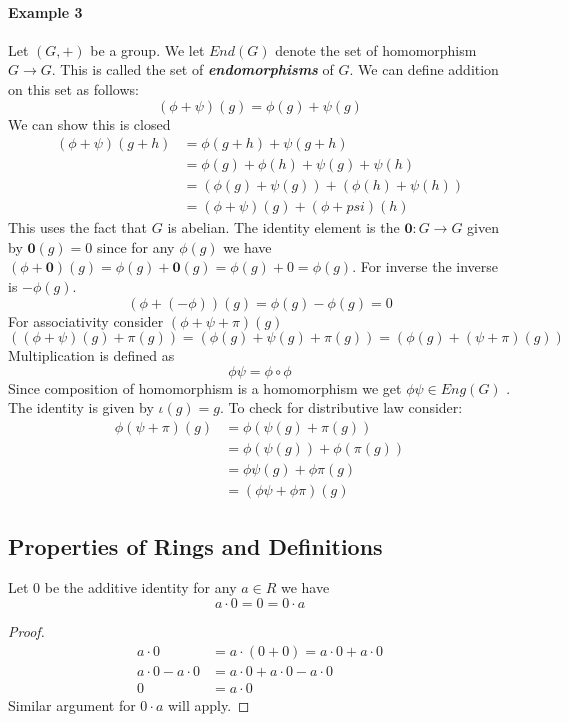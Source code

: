 \documentclass[16pt,a4paper]{article}
\theoremstyle{definition}
\begin{document}
\newpage
\paragraph*{Example 3} Let $(G,+)$ be a group. We let $End(G)$ denote the set of homomorphism $G\rightarrow G$. This is called the set of \emph{\textbf{endomorphisms}} of $G$. We can define addition on this set as follows: 
\[(\phi+\psi)(g) = \phi(g) + \psi(g)\]
We can show this is closed 
\begin{align*}
(\phi+\psi)(g+h) &= \phi(g+h)+\psi(g+h)\\
&= \phi(g)+\phi(h) + \psi(g) + \psi(h) \\
&= (\phi(g)+\psi(g)) + (\phi(h) + \psi(h))\\
&= (\phi+\psi)(g) + (\phi + psi)(h)
\end{align*}
This uses the fact that $G$ is abelian. The identity element is the $\mathbf{0}:G\rightarrow G$ given by $\mathbf{0}(g) = 0$ since for any $\phi(g)$ we have $(\phi+\mathbf{0})(g) = \phi(g) + \mathbf{0}(g) = \phi(g)+0=\phi(g)$. For inverse the inverse is $-\phi(g)$. 
\[(\phi+(-\phi))(g)  = \phi(g)-\phi(g) = 0\]
For associativity consider $(\phi + \psi + \pi)(g)$
\[((\phi+\psi)(g) + \pi(g)) = (\phi(g)+\psi(g)+\pi(g))=(\phi(g)+(\psi+\pi)(g))\] 
Multiplication is defined as
\[\phi\psi = \phi\circ \phi\]
Since composition of homomorphism is a homomorphism we get $\phi\psi \in Eng(G)$ . The identity is given by $\iota(g) = g$. To check for distributive law consider: 
\begin{align*}
\phi(\psi+\pi)(g) &= \phi(\psi(g)+\pi(g))\\
&=\phi(\psi(g)) + \phi(\pi(g))\\
&=\phi\psi(g) + \phi\pi(g)\\
&=(\phi\psi+\phi\pi)(g)
\end{align*}


\newpage
\subsection{Properties of Rings and Definitions}

\begin{thm}{}{}
Let $0$ be the additive identity for any $a\in R$ we have 
\[a\cdot 0 = 0 = 0\cdot a\] 
\end{thm}
\begin{proof}
\begin{align*}
a\cdot 0 &= a\cdot (0+0) = a\cdot 0 + a\cdot 0\\
a\cdot 0 - a\cdot 0 &= a\cdot 0 + a\cdot 0 - a\cdot 0 \\
0 &= a\cdot 0
\end{align*}
Similar argument for $0\cdot a$ will apply. 
\end{proof}
\end{document}
